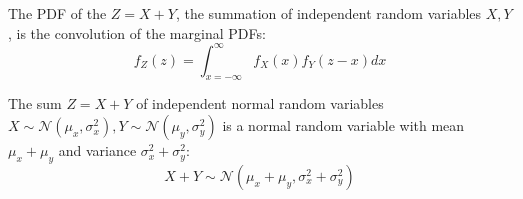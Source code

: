 \begin{theorem}
    The PDF of the \(Z = X + Y\), the summation of independent random variables \(X, Y\), is the convolution of the marginal PDFs: 
    \[
        f_Z(z) = \int_{x =-\infty}^{\infty} f_X(x) f_Y(z - x) dx
    \]
\end{theorem}

\begin{corollary}
    The sum \(Z = X + Y\) of independent normal random variables \(X \sim \mathcal{N} (\mu_x, \sigma_x^2), Y \sim \mathcal{N} (\mu_y, \sigma_y^2)\) is a normal random variable with mean \(\mu_x + \mu_y\) and variance \(\sigma_x^2 + \sigma_y^2\): 
    \[
        X + Y \sim \mathcal{N} (\mu_x + \mu_y, \sigma_x^2 + \sigma_y^2)
    \]  
\end{corollary}

